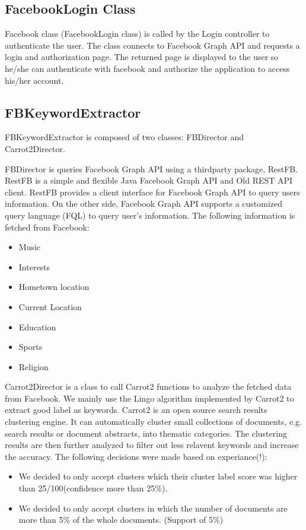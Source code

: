 \documentclass{article}
\begin{document}
\subsection{FacebookLogin Class}
Facebook class (FacebookLogin class) is called by the Login controller to authenticate the user. The class connects to Facebook Graph API and requests a login and authorization page. The returned page is displayed to the user so he/she can authenticate with facebook and authorize the application to access his/her account.  

\subsection{FBKeywordExtractor}
FBKeywordExtractor is composed of two classes: FBDirector and Carrot2Director. 

FBDirector is queries Facebook Graph API using a thirdparty package, RestFB. RestFB is a simple and flexible Java Facebook Graph API and Old REST API client. RestFB provides a client interface for Facebook Graph API to query users information. On the other side, Facebook Graph API	 supports a customized query language (FQL) to query user's information. The following information is fetched from Facebook:
\begin{itemize}
\item Music 
\item Interests
\item Hometown location
\item Current Location
\item Education
\item Sports
\item Religion
\end{itemize}

Carrot2Director is a class to call Carrot2 functions to analyze the fetched data from Facebook. We mainly use the Lingo algorithm implemented by Carrot2 to extract good label as keywords. Carrot2 is an open source search results clustering engine. It can automatically cluster small collections of documents, e.g. search results or document abstracts, into thematic categories. The clustering results are then further analyzed to filter out less relavent keywords and increase the accuracy. The following decisions were made based on experiance(!):
\begin{itemize}
\item We decided to only accept clusters which their cluster label score was higher than 25/100(confidence more than 25\%).
\item We decided to only accept clusters in which the number of documents are more than 5\% of the whole documents. (Support of 5\%)
\end{itemize}
\end{document}
